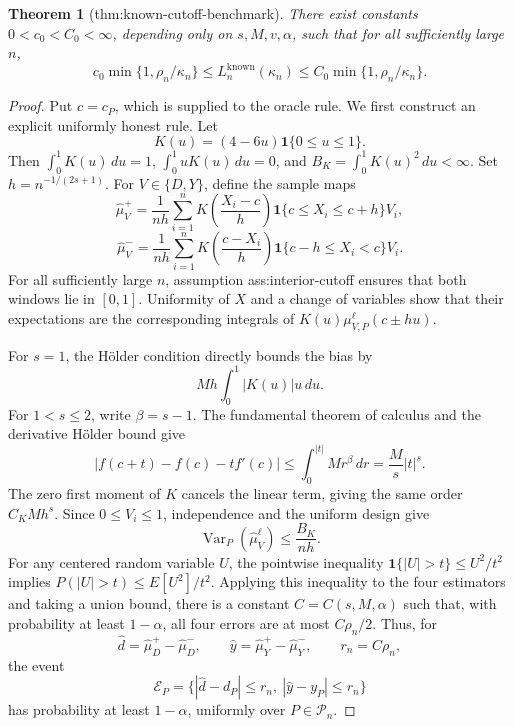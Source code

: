 \documentclass{article}
\newtheorem{theorem}{Theorem}
\begin{document}
\begin{theorem}[thm:known-cutoff-benchmark]\label{thm:known-cutoff-benchmark}
There exist constants \(0<c_0<C_0<\infty\), depending only on \(s,M,v,\alpha\), such that for all sufficiently large \(n\), \[c_0\min\{1,\rho_n/\kappa_n\}\le L_n^{\mathrm{known}}(\kappa_n)\le C_0\min\{1,\rho_n/\kappa_n\}.\]
\end{theorem}
\begin{proof}
Put \(c=c_P\), which is supplied to the oracle rule.  We first construct an explicit uniformly honest rule.  Let
\[
 K(u)=(4-6u)\mathbf 1\{0\le u\le1\}.
\]
Then \(\int_0^1K(u)\,du=1\), \(\int_0^1uK(u)\,du=0\), and \(B_K=\int_0^1K(u)^2\,du<\infty\).  Set \(h=n^{-1/(2s+1)}\).  For \(V\in\{D,Y\}\), define the sample maps
\[
 \widehat\mu_V^+=\frac1{nh}\sum_{i=1}^nK\left(\frac{X_i-c}{h}\right)
 \mathbf 1\{c\le X_i\le c+h\}V_i,
\]
\[
 \widehat\mu_V^-=\frac1{nh}\sum_{i=1}^nK\left(\frac{c-X_i}{h}\right)
 \mathbf 1\{c-h\le X_i<c\}V_i.
\]
For all sufficiently large \(n\), assumption ass:interior-cutoff ensures that both windows lie in \([0,1]\).  Uniformity of \(X\) and a change of variables show that their expectations are the corresponding integrals of \(K(u)\mu^\ell_{V,P}(c\pm hu)\).

For \(s=1\), the H\"older condition directly bounds the bias by
\[
 M h\int_0^1|K(u)|u\,du.
\]
For \(1<s\le2\), write \(\beta=s-1\).  The fundamental theorem of calculus and the derivative H\"older bound give
\[
 |f(c+t)-f(c)-tf'(c)|
 \le\int_0^{|t|}M r^\beta\,dr
 =\frac{M}{s}|t|^s.
\]
The zero first moment of \(K\) cancels the linear term, giving the same order \(C_KMh^s\).  Since \(0\le V_i\le1\), independence and the uniform design give
\[
 \operatorname{Var}_P(\widehat\mu_V^\ell)\le\frac{B_K}{nh}.
\]
For any centered random variable \(U\), the pointwise inequality \(\mathbf 1\{|U|>t\}\le U^2/t^2\) implies \(P(|U|>t)\le E[U^2]/t^2\).  Applying this inequality to the four estimators and taking a union bound, there is a constant \(C=C(s,M,\alpha)\) such that, with probability at least \(1-\alpha\), all four errors are at most \(C\rho_n/2\).  Thus, for
\[
 \widehat d=\widehat\mu_D^+-\widehat\mu_D^-,\qquad
 \widehat y=\widehat\mu_Y^+-\widehat\mu_Y^-,\qquad r_n=C\rho_n,
\]
the event
\[
 \mathcal E_P=\{|\widehat d-d_P|\le r_n,\ |\widehat y-y_P|\le r_n\}
\]
has probability at least \(1-\alpha\), uniformly over \(P\in\mathcal P_n\).


\end{proof}
\end{document}
